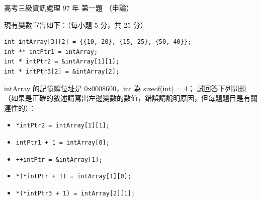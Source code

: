 \begin{pastexam}[label={px:gk3-097-ds-01}]{高考三級資訊處理 97 年 第一題}
（申論）

現有變數宣告如下：（每小題 5 分，共 25 分）
\begin{verbatim}
int intArray[3][2] = {{10, 20}, {15, 25}, {50, 40}};
int ** intPtr1 = intArray;
int * intPtr2 = &intArray[1][1];
int * intPtr3[2] = &intArray[2];
\end{verbatim}
intArray 的記憶體位址是 0x0008600，int 為 sizeof(int) = 4；
試回答下列問題（如果是正確的敘述請寫出左邊變數的數值，錯誤請說明原因，但每題題目是有關連性的）：
\begin{itemize}[leftmargin=2.2em, nosep]
\item[㈠] \texttt{*intPtr2 = intArray[1][1];}
\item[㈡] \texttt{intPtr1 + 1 = intArray[0];}
\item[㈢] \texttt{++intPtr = \&intArray[1];}
\item[㈣] \texttt{*(*intPtr + 1) = intArray[1][0];}
\item[㈤] \texttt{*(*intPtr3 + 1) = intArray[2][1];}
\end{itemize}
\end{pastexam}

